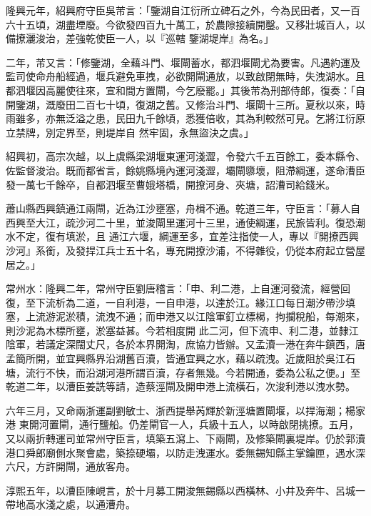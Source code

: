\begin{pinyinscope}
 隆興元年，紹興府守臣吳芾言：「鑒湖自江衍所立碑石之外，今為民田者，又一百六十五頃，湖盡堙廢。今欲發四百九十萬工，於農隙接續開鑿。又移壯城百人，以備撩灑浚治，差強乾使臣一人，以『巡轄
 鑒湖堤岸』為名。」



 二年，芾又言：「修鑒湖，全藉斗門、堰閘蓄水，都泗堰閘尤為要害。凡遇約運及監司使命舟船經過，堰兵避免車拽，必欲開閘通放，以致啟閉無時，失洩湖水。且都泗堰因高麗使往來，宣和間方置閘，今乞廢罷。」其後芾為刑部侍郎，復奏：「自開鑒湖，溉廢田二百七十頃，復湖之舊。又修治斗門、堰閘十三所。夏秋以來，時雨雖多，亦無泛溢之患，民田九千餘頃，悉獲倍收，其為利較然可見。乞將江衍原立禁牌，別定界至，則堤岸自
 然牢固，永無盜決之虞。」



 紹興初，高宗次越，以上虞縣梁湖堰東運河淺澀，令發六千五百餘工，委本縣令、佐監督浚治。既而都省言，餘姚縣境內運河淺澀，壩閘隳壞，阻滯綱運，遂命漕臣發一萬七千餘卒，自都泗堰至曹娥塔橋，開撩河身、夾塘，詔漕司給錢米。



 蕭山縣西興鎮通江兩閘，近為江沙壅塞，舟楫不通。乾道三年，守臣言：「募人自西興至大江，疏沙河二十里，並浚閘里運河十三里，通使綱運，民旅皆利。復恐潮水不定，復有填淤，且
 通江六堰，綱運至多，宜差注指使一人，專以『開撩西興沙河』系銜，及發捍江兵士五十名，專充開撩沙浦，不得雜役，仍從本府起立營屋居之。」



 常州水：隆興二年，常州守臣劉唐稽言：「申、利二港，上自運河發流，經營回復，至下流析為二道，一自利港，一自申港，以達於江。緣江口每日潮汐帶沙填塞，上流游泥淤積，流洩不通；而申港又以江陰軍釘立標楬，拘攔稅船，每潮來，則沙泥為木標所壅，淤塞益甚。今若相度開
 此二河，但下流申、利二港，並隸江陰軍，若議定深闊丈尺，各於本界開淘，庶協力皆辦。又孟瀆一港在奔牛鎮西，唐孟簡所開，並宜興縣界沿湖舊百瀆，皆通宜興之水，藉以疏洩。近歲阻於吳江石塘，流行不快，而沿湖河港所謂百瀆，存者無幾。今若開通，委為公私之便。」至乾道二年，以漕臣姜詵等請，造蔡涇閘及開申港上流橫石，次浚利港以洩水勢。



 六年三月，又命兩浙運副劉敏士、浙西提舉芮輝於新涇塘置閘堰，以捍海潮；楊家港
 東開河置閘，通行鹽船。仍差閘官一人，兵級十五人，以時啟閉挑撩。五月，又以兩折轉運司並常州守臣言，填築五瀉上、下兩閘，及修築閘裏堤岸。仍於郭瀆港口舜郎廟側水聚會處，築捺硬壩，以防走洩運水。委無錫知縣主掌鑰匣，遇水深六尺，方許開閘，通放客舟。



 淳熙五年，以漕臣陳峴言，於十月募工開浚無錫縣以西橫林、小井及奔牛、呂城一帶地高水淺之處，以通漕舟。




\end{pinyinscope}
